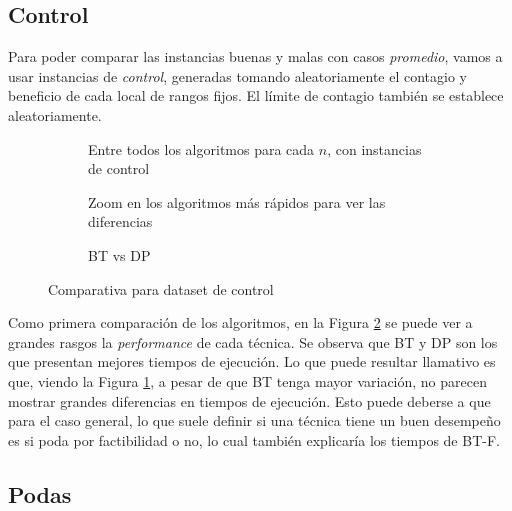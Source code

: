 \subsection{Control}

Para poder comparar las instancias buenas y malas con casos \textit{promedio}, vamos a usar instancias de \textit{control}, generadas tomando aleatoriamente el contagio y beneficio de cada local de rangos fijos. El límite de contagio también se establece aleatoriamente.

\begin{figure}[H]
    \centering
    \begin{subfigure}[H]{0.45\textwidth}
        \centering
        
        \caption{Entre todos los algoritmos para cada $n$, con instancias de control}
    \end{subfigure}
    \begin{subfigure}[H]{0.45\textwidth}
        \centering
        
        \caption{Zoom en los algoritmos más rápidos para ver las diferencias}
    \end{subfigure}
    \begin{subfigure}[H]{0.45\textwidth}
        \centering
        
        \caption{BT vs DP}
        \label{fig:comp-control-bt-dp}
    \end{subfigure}
    \caption{Comparativa para dataset de control}
    \label{fig:comp-control}
\end{figure}

Como primera comparación de los algoritmos, en la Figura \ref{fig:comp-control} se puede ver a grandes rasgos la \textit{performance} de cada técnica. Se observa que BT y DP son los que presentan mejores tiempos de ejecución. Lo que puede resultar llamativo es que, viendo la Figura \ref{fig:comp-control-bt-dp}, a pesar de que BT tenga mayor variación, no parecen mostrar grandes diferencias en tiempos de ejecución. Esto puede deberse a que para el caso general, lo que suele definir si una técnica tiene un buen desempeño es si poda por factibilidad o no, lo cual también explicaría los tiempos de BT-F.

\subsection{Podas}

